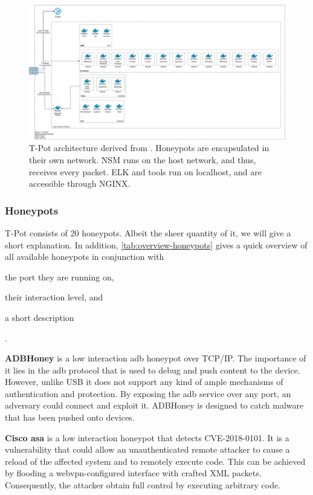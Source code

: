 \begin{figure}
    \centering
    \includegraphics[width=\textwidth]{figures/tpot-architecture.pdf}
    \caption[T-Pot architecture]{T-Pot architecture derived from \cite{tpot2021}. Honeypots are encapsulated in their own network. NSM runs on the host network, and thus, receives every packet. ELK and tools run on localhost, and are accessible through NGINX.}
    \label{fig:overview-tpot}
\end{figure}

\subsubsection{Honeypots}

T-Pot consists of 20 honeypots. Albeit the sheer quantity of it, we will give a short explanation.
In addition, \autoref{tab:overview-honeypots} gives a quick overview of all available honeypots in conjunction with
\begin{enumerate*}[label=(\roman*)]
    \item the port they are running on,
    \item their interaction level, and
    \item a short description
\end{enumerate*}.

\textbf{ADBHoney} \cite{adbhoney2021} is a low interaction \ac{adb} honeypot over TCP/IP.
The importance of it lies in the \ac{adb} protocol that is used to debug and push content to the device.
However, unlike USB it does not support any kind of ample mechanisms of authentication and protection.
By exposing the \ac{adb} service over any port, an adversary could connect and exploit it.
ADBHoney is designed to catch malware that has been pushed onto devices.

\textbf{Cisco \ac{asa}} \cite{cymmetria2018} is a low interaction honeypot that detects CVE-2018-0101\cite{CVE-2018-0101}.
It is a vulnerability that could allow an unauthenticated remote attacker to cause a reload of the affected system and to remotely execute code.
This can be achieved by flooding a webvpn-configured interface with crafted XML packets.
Consequently, the attacker obtain full control by executing arbitrary code.

